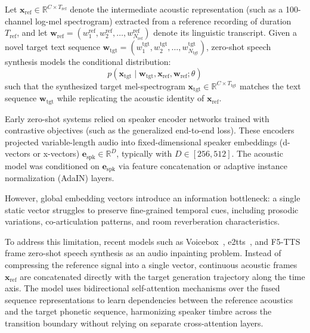 Let $\mathbf{x}_{\text{ref}} \in \mathbb{R}^{C \times T_{\text{ref}}}$ denote the intermediate acoustic representation (such as a 100-channel log-mel spectrogram) extracted from a reference recording of duration $T_{\text{ref}}$, and let $\mathbf{w}_{\text{ref}} = (w_1^{\text{ref}}, w_2^{\text{ref}}, \dots, w_{N_{\text{ref}}}^{\text{ref}})$ denote its linguistic transcript. Given a novel target text sequence $\mathbf{w}_{\text{tgt}} = (w_1^{\text{tgt}}, w_2^{\text{tgt}}, \dots, w_{N_{\text{tgt}}}^{\text{tgt}})$, zero-shot speech synthesis models the conditional distribution:
\begin{equation}
    p(\mathbf{x}_{\text{tgt}} \mid \mathbf{w}_{\text{tgt}}, \mathbf{x}_{\text{ref}}, \mathbf{w}_{\text{ref}}; \theta)
    \label{eq:zero_shot_conditional}
\end{equation}
such that the synthesized target mel-spectrogram $\mathbf{x}_{\text{tgt}} \in \mathbb{R}^{C \times T_{\text{tgt}}}$ matches the text sequence $\mathbf{w}_{\text{tgt}}$ while replicating the acoustic identity of $\mathbf{x}_{\text{ref}}$.

Early zero-shot systems relied on speaker encoder networks trained with contrastive objectives (such as the generalized end-to-end loss). These encoders projected variable-length audio into fixed-dimensional speaker embeddings (d-vectors or x-vectors) $\mathbf{e}_{\text{spk}} \in \mathbb{R}^D$, typically with $D \in [256, 512]$. The acoustic model was conditioned on $\mathbf{e}_{\text{spk}}$ via feature concatenation or adaptive instance normalization (AdaIN) layers.

However, global embedding vectors introduce an information bottleneck: a single static vector struggles to preserve fine-grained temporal cues, including prosodic variations, co-articulation patterns, and room reverberation characteristics.

To address this limitation, recent models such as Voicebox~\cite{le2023voicebox}, \gls{e2tts}~\cite{e2tts2024}, and F5-TTS~\cite{chen2024f5tts} frame zero-shot speech synthesis as an audio inpainting problem. Instead of compressing the reference signal into a single vector, continuous acoustic frames $\mathbf{x}_{\text{ref}}$ are concatenated directly with the target generation trajectory along the time axis. The model uses bidirectional self-attention mechanisms over the fused sequence representations to learn dependencies between the reference acoustics and the target phonetic sequence, harmonizing speaker timbre across the transition boundary without relying on separate cross-attention layers.

